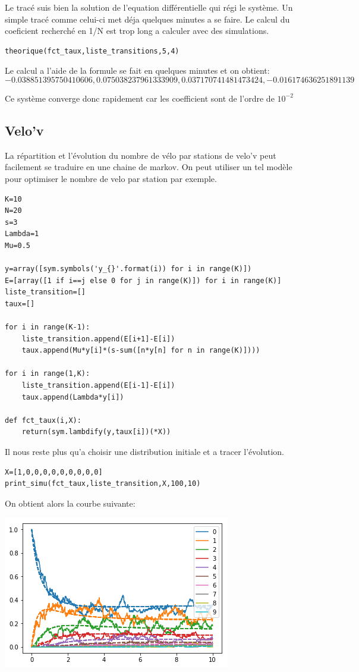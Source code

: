\documentclass[a4paper]{article}
\begin{document}
Le tracé suis bien la solution de l'equation différentielle qui régi
le système. Un simple tracé comme celui-ci met déja quelques minutes a
se faire. Le calcul du coeficient recherché en 1/N est trop long a
calculer avec des simulations.

\begin{lstlisting}[frame=single]
theorique(fct_taux,liste_transitions,5,4)
\end{lstlisting}

Le calcul a l'aide de la formule se fait en quelques minutes et on
obtient:  \[ -0.038851395750410606, 0.075038237961333909,
  0.037170741481473424, -0.016174636251891139 \] 

Ce système converge donc rapidement car les coefficient sont de
l'ordre de $10^{-2}$

\subsection{Velo'v}
La répartition et l'évolution du nombre de vélo par stations de velo'v
peut facilement se traduire en une chaine de markov. On peut utiliser
un tel modèle \cite{velov} pour optimiser le nombre de velo par station par
exemple.

\begin{lstlisting}[frame=single]
K=10
N=20
s=3
Lambda=1
Mu=0.5

y=array([sym.symbols('y_{}'.format(i)) for i in range(K)])
E=[array([1 if i==j else 0 for j in range(K)]) for i in range(K)]
liste_transition=[]
taux=[]

for i in range(K-1):
    liste_transition.append(E[i+1]-E[i])
    taux.append(Mu*y[i]*(s-sum([n*y[n] for n in range(K)])))
    
for i in range(1,K):
    liste_transition.append(E[i-1]-E[i])
    taux.append(Lambda*y[i])
    
def fct_taux(i,X):
    return(sym.lambdify(y,taux[i])(*X))
\end{lstlisting}

Il nous reste plus qu'a choisir une distribution initiale et a tracer
l'évolution.

\begin{lstlisting}[frame=single]
X=[1,0,0,0,0,0,0,0,0,0]
print_simu(fct_taux,liste_transition,X,100,10)
\end{lstlisting}

On obtient alors la courbe suivante:

\includegraphics{velov.png}
\end{document}
